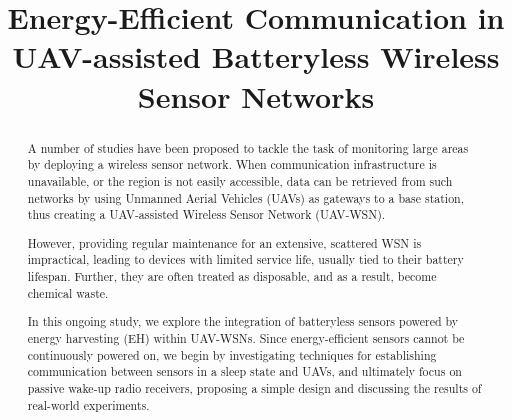 \documentclass[conference]{IEEEtran}
\begin{document}
\title{Energy-Efficient Communication in UAV-assisted Batteryless Wireless Sensor Networks}

\author{
  \and
  \and
  \and
}

\maketitle

\begin{abstract}
  A number of studies have been proposed to tackle the task of monitoring large areas by deploying a wireless sensor network. When communication infrastructure is unavailable, or the region is not easily accessible, data can be retrieved from such networks by using Unmanned Aerial Vehicles (UAVs) as gateways to a base station, thus creating a UAV-assisted Wireless Sensor Network (UAV-WSN).

  However, providing regular maintenance for an extensive, scattered WSN is impractical, leading to devices with limited service life, usually tied to their battery lifespan. Further, they are often treated as disposable, and as a result, become chemical waste.

  In this ongoing study, we explore the integration of batteryless sensors powered by energy harvesting (EH) within UAV-WSNs. Since energy-efficient sensors cannot be continuously powered on, we begin by investigating techniques for establishing communication between sensors in a sleep state and UAVs, and ultimately focus on passive wake-up radio receivers, proposing a simple design and discussing the results of real-world experiments.
\end{abstract}
\end{document}
